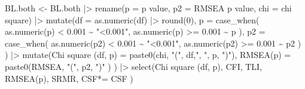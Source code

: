 \documentclass[
]{article}
\newenvironment{Shaded}{\begin{snugshade}}{\end{snugshade}}
\newcommand{\AttributeTok}[1]{\textcolor[rgb]{0.77,0.63,0.00}{#1}}
\newcommand{\DecValTok}[1]{\textcolor[rgb]{0.00,0.00,0.81}{#1}}
\newcommand{\FloatTok}[1]{\textcolor[rgb]{0.00,0.00,0.81}{#1}}
\newcommand{\FunctionTok}[1]{\textcolor[rgb]{0.00,0.00,0.00}{#1}}
\newcommand{\NormalTok}[1]{#1}
\newcommand{\OtherTok}[1]{\textcolor[rgb]{0.56,0.35,0.01}{#1}}
\newcommand{\SpecialCharTok}[1]{\textcolor[rgb]{0.00,0.00,0.00}{#1}}
\newcommand{\StringTok}[1]{\textcolor[rgb]{0.31,0.60,0.02}{#1}}
\begin{document}
\begin{Shaded}
\begin{Highlighting}[]
\NormalTok{BL.both }\OtherTok{\textless{}{-}}\NormalTok{ BL.both }\SpecialCharTok{|\textgreater{}} 
  \FunctionTok{rename}\NormalTok{(}\AttributeTok{p =} \StringTok{\textquotesingle{}p value\textquotesingle{}}\NormalTok{,}
         \AttributeTok{p2 =} \StringTok{\textquotesingle{}RMSEA p value\textquotesingle{}}\NormalTok{,}
         \AttributeTok{chi =} \StringTok{\textquotesingle{}chi square\textquotesingle{}}\NormalTok{) }\SpecialCharTok{|\textgreater{}} 
  \FunctionTok{mutate}\NormalTok{(}\AttributeTok{df =} \FunctionTok{as.numeric}\NormalTok{(df) }\SpecialCharTok{|\textgreater{}} \FunctionTok{round}\NormalTok{(}\DecValTok{0}\NormalTok{),}
         \AttributeTok{p =} \FunctionTok{case\_when}\NormalTok{(}
           \FunctionTok{as.numeric}\NormalTok{(p) }\SpecialCharTok{\textless{}} \FloatTok{0.001} \SpecialCharTok{\textasciitilde{}} \StringTok{"\textless{}0.001"}\NormalTok{,}
           \FunctionTok{as.numeric}\NormalTok{(p) }\SpecialCharTok{\textgreater{}=} \FloatTok{0.001} \SpecialCharTok{\textasciitilde{}}\NormalTok{ p}
\NormalTok{           ),}
         \AttributeTok{p2 =} \FunctionTok{case\_when}\NormalTok{(}
           \FunctionTok{as.numeric}\NormalTok{(p2) }\SpecialCharTok{\textless{}} \FloatTok{0.001} \SpecialCharTok{\textasciitilde{}} \StringTok{"\textless{}0.001"}\NormalTok{,}
           \FunctionTok{as.numeric}\NormalTok{(p2) }\SpecialCharTok{\textgreater{}=} \FloatTok{0.001} \SpecialCharTok{\textasciitilde{}}\NormalTok{ p2}
\NormalTok{           )}
\NormalTok{         ) }\SpecialCharTok{|\textgreater{}}
  \FunctionTok{mutate}\NormalTok{(}\StringTok{\textquotesingle{}Chi square (df, p)\textquotesingle{}} \OtherTok{=} 
           \FunctionTok{paste0}\NormalTok{(chi, }\StringTok{"("}\NormalTok{, df,}\StringTok{", "}\NormalTok{, p, }\StringTok{")"}\NormalTok{),}
         \StringTok{\textquotesingle{}RMSEA(p)\textquotesingle{}}           \OtherTok{=} 
           \FunctionTok{paste0}\NormalTok{(RMSEA, }\StringTok{"("}\NormalTok{, p2, }\StringTok{")"}
\NormalTok{                  )}
\NormalTok{         ) }\SpecialCharTok{|\textgreater{}} 
  \FunctionTok{select}\NormalTok{(}\StringTok{\textquotesingle{}Chi square (df, p)\textquotesingle{}}\NormalTok{, }
\NormalTok{         CFI, TLI, }
         \StringTok{\textquotesingle{}RMSEA(p)\textquotesingle{}}\NormalTok{, }
\NormalTok{         SRMR, }
         \StringTok{\textquotesingle{}CSF*\textquotesingle{}}\OtherTok{=}\NormalTok{ CSF}
\NormalTok{         ) }


\end{Highlighting}
\end{Shaded}
\end{document}
